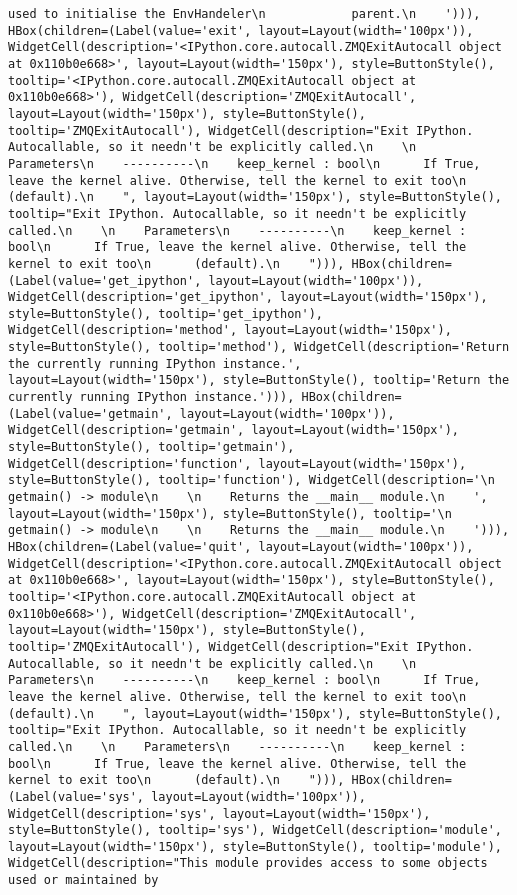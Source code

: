 \documentclass[11pt]{article}
\begin{document}
\begin{verbatim}
used to initialise the EnvHandeler\n            parent.\n    '))), HBox(children=(Label(value='exit', layout=Layout(width='100px')), WidgetCell(description='<IPython.core.autocall.ZMQExitAutocall object at 0x110b0e668>', layout=Layout(width='150px'), style=ButtonStyle(), tooltip='<IPython.core.autocall.ZMQExitAutocall object at 0x110b0e668>'), WidgetCell(description='ZMQExitAutocall', layout=Layout(width='150px'), style=ButtonStyle(), tooltip='ZMQExitAutocall'), WidgetCell(description="Exit IPython. Autocallable, so it needn't be explicitly called.\n    \n    Parameters\n    ----------\n    keep_kernel : bool\n      If True, leave the kernel alive. Otherwise, tell the kernel to exit too\n      (default).\n    ", layout=Layout(width='150px'), style=ButtonStyle(), tooltip="Exit IPython. Autocallable, so it needn't be explicitly called.\n    \n    Parameters\n    ----------\n    keep_kernel : bool\n      If True, leave the kernel alive. Otherwise, tell the kernel to exit too\n      (default).\n    "))), HBox(children=(Label(value='get_ipython', layout=Layout(width='100px')), WidgetCell(description='get_ipython', layout=Layout(width='150px'), style=ButtonStyle(), tooltip='get_ipython'), WidgetCell(description='method', layout=Layout(width='150px'), style=ButtonStyle(), tooltip='method'), WidgetCell(description='Return the currently running IPython instance.', layout=Layout(width='150px'), style=ButtonStyle(), tooltip='Return the currently running IPython instance.'))), HBox(children=(Label(value='getmain', layout=Layout(width='100px')), WidgetCell(description='getmain', layout=Layout(width='150px'), style=ButtonStyle(), tooltip='getmain'), WidgetCell(description='function', layout=Layout(width='150px'), style=ButtonStyle(), tooltip='function'), WidgetCell(description='\n    getmain() -> module\n    \n    Returns the __main__ module.\n    ', layout=Layout(width='150px'), style=ButtonStyle(), tooltip='\n    getmain() -> module\n    \n    Returns the __main__ module.\n    '))), HBox(children=(Label(value='quit', layout=Layout(width='100px')), WidgetCell(description='<IPython.core.autocall.ZMQExitAutocall object at 0x110b0e668>', layout=Layout(width='150px'), style=ButtonStyle(), tooltip='<IPython.core.autocall.ZMQExitAutocall object at 0x110b0e668>'), WidgetCell(description='ZMQExitAutocall', layout=Layout(width='150px'), style=ButtonStyle(), tooltip='ZMQExitAutocall'), WidgetCell(description="Exit IPython. Autocallable, so it needn't be explicitly called.\n    \n    Parameters\n    ----------\n    keep_kernel : bool\n      If True, leave the kernel alive. Otherwise, tell the kernel to exit too\n      (default).\n    ", layout=Layout(width='150px'), style=ButtonStyle(), tooltip="Exit IPython. Autocallable, so it needn't be explicitly called.\n    \n    Parameters\n    ----------\n    keep_kernel : bool\n      If True, leave the kernel alive. Otherwise, tell the kernel to exit too\n      (default).\n    "))), HBox(children=(Label(value='sys', layout=Layout(width='100px')), WidgetCell(description='sys', layout=Layout(width='150px'), style=ButtonStyle(), tooltip='sys'), WidgetCell(description='module', layout=Layout(width='150px'), style=ButtonStyle(), tooltip='module'), WidgetCell(description="This module provides access to some objects used or maintained by 
\end{verbatim}
\end{document}
